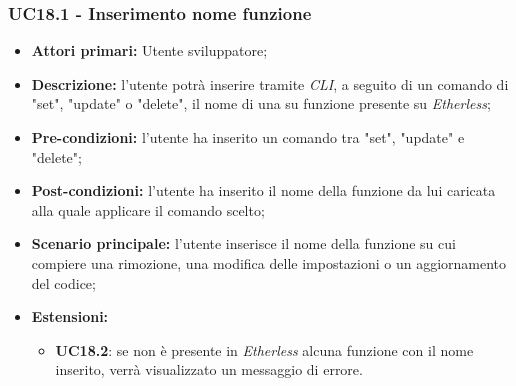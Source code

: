 \subsubsection{UC18.1 - Inserimento nome funzione}
\begin{itemize}
	\item \textbf{Attori primari:} Utente sviluppatore;
	\item \textbf{Descrizione:} l'utente potrà inserire tramite \textit{CLI}, a seguito di un comando di "set", "update" o "delete", il nome di una su funzione presente su \textit{Etherless}; 
	\item \textbf{Pre-condizioni:} l'utente ha inserito un comando tra "set", "update" e "delete";
	\item \textbf{Post-condizioni:} l'utente ha inserito il nome della funzione da lui caricata alla quale applicare il comando scelto;
	\item \textbf{Scenario principale:} l'utente inserisce il nome della funzione su cui compiere una rimozione, una modifica delle impostazioni o un aggiornamento del codice;
	\item \textbf{Estensioni:} 
	\begin{itemize}
		\item \textbf{UC18.2}: se non è presente in \textit{Etherless} alcuna funzione con il nome inserito, verrà visualizzato un messaggio di errore.
	\end{itemize}
\end{itemize}